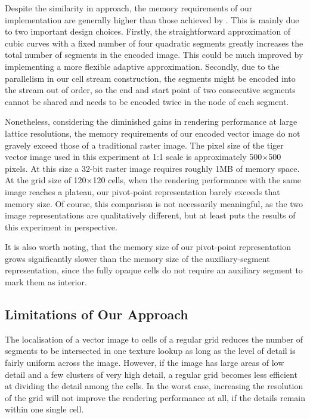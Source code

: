 \documentclass[11pt,a4paper,twoside]{article}
\begin{document}
Despite the similarity in approach, the memory requirements of our implementation are generally higher than those achieved by \cite{NehabHoppe08}. This is mainly due to two important design choices. Firstly, the straightforward approximation of cubic curves with a fixed number of four quadratic segments greatly increases the total number of segments in the encoded image. This could be much improved by implementing a more flexible adaptive approximation. Secondly, due to the parallelism in our cell stream construction, the segments might be encoded into the stream out of order, so the end and start point of two consecutive segments cannot be shared and needs to be encoded twice in the node of each segment.

Nonetheless, considering the diminished gains in rendering performance at large lattice resolutions, the memory requirements of our encoded vector image do not gravely exceed those of a traditional raster image. The pixel size of the tiger vector image used in this experiment at 1:1 scale is approximately 500$\times$500 pixels. At this size a 32-bit raster image requires roughly 1MB of memory space. At the grid size of 120$\times$120 cells, when the rendering performance with the same image reaches a plateau, our pivot-point representation barely exceeds that memory size. Of course, this comparison is not necessarily meaningful, as the two image representations are qualitatively different, but at least puts the results of this experiment in perspective.

It is also worth noting, that the memory size of our pivot-point representation grows significantly slower than the memory size of the auxiliary-segment representation, since the fully opaque cells do not require an auxiliary segment to mark them as interior.

\subsection {Limitations of Our Approach}

The localisation of a vector image to cells of a regular grid reduces the number of segments to be intersected in one texture lookup as long as the level of detail is fairly uniform across the image. However, if the image has large areas of low detail and a few clusters of very high detail, a regular grid becomes less efficient at dividing the detail among the cells. In the worst case, increasing the resolution of the grid will not improve the rendering performance at all, if the details remain within one single cell.
\end{document}
